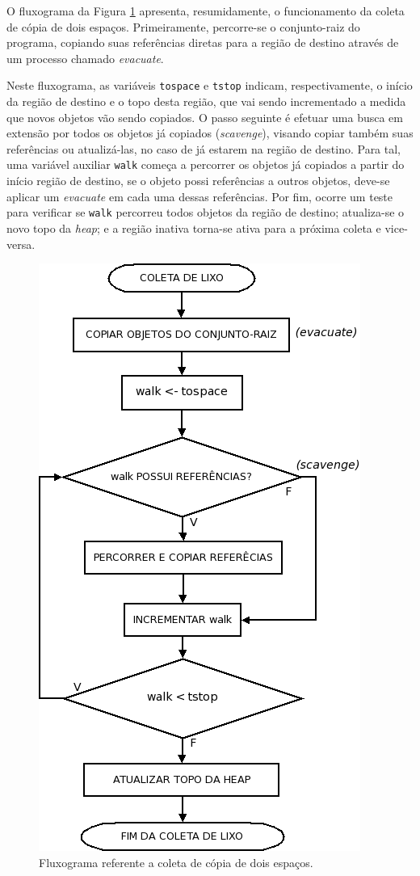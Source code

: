 \documentclass[ccc, pg2]{esinucpel}
\begin{document}
O fluxograma da Figura \ref{fig:copyflow} apresenta, resumidamente, o funcionamento da coleta de cópia de dois espaços. Primeiramente, percorre-se o conjunto-raiz do programa, copiando suas referências diretas para a região de destino através de um processo chamado {\it evacuate}.

Neste fluxograma, as variáveis {\tt tospace} e {\tt tstop} indicam, respectivamente, o início da região de destino e o topo desta região, que vai sendo incrementado a medida que novos objetos vão sendo copiados. O passo seguinte é efetuar uma busca em extensão por todos os objetos já copiados ({\it scavenge}), visando copiar também suas referências ou atualizá-las, no caso de já estarem na região de destino. Para tal, uma variável auxiliar {\tt walk} começa a percorrer os objetos já copiados a partir do início região de destino, se o objeto possi referências a outros objetos, deve-se aplicar um {\it evacuate} em cada uma dessas referências. Por fim, ocorre um teste para verificar se {\tt walk} percorreu todos objetos da região de destino; atualiza-se o novo topo da {\it heap}; e a região inativa torna-se ativa para a próxima coleta e vice-versa.

\begin{figure}[h]
\centering
\includegraphics[width=.45\textwidth]{images/copy_flow.png}
\caption{Fluxograma referente a coleta de cópia de dois espaços.}
\label{fig:copyflow}
\end{figure}

%
\end{document}
